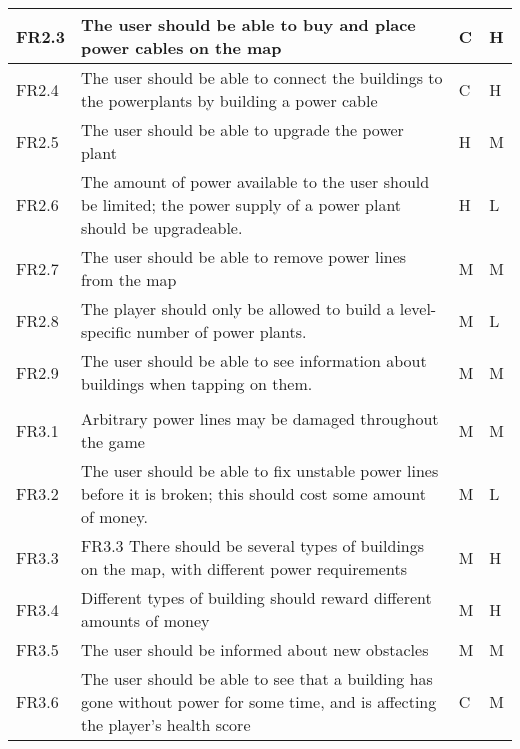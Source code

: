 \begin{longtable}{| p{1.5cm} | p{8cm} | p{1.5cm} | p{2cm} |}
   FR2.3 & The user should be able to buy and place power cables on the map & C & H \\ \hline

   FR2.4 & The user should be able to connect the buildings to the powerplants by building a power 
   cable & C & H \\ \hline

   FR2.5 & The user should be able to upgrade the power plant & H & M \\ \hline

   FR2.6 & The amount of power available to the user should be limited; the power supply of a 
   power plant should be upgradeable. & H & L \\ \hline

   FR2.7 & The user should be able to remove power lines from the map & M & M \\ \hline

   FR2.8 & The player should only be allowed to build a level-specific number of power plants. & M & L \\ \hline

   FR2.9 & The user should be able to see information about buildings when tapping on them. & M & M \\ \hline
\pagebreak
\hline
\multicolumn{4}{|>{\columncolor[gray]{.8}}l|}{3) Obstacles} \\ \hline

   FR3.1 & Arbitrary power lines may be damaged throughout the game & M & M \\ \hline

   FR3.2 & The user should be able to fix unstable power lines before it is broken; 
   this should cost some amount of money. & M & L \\ \hline

   FR3.3 & FR3.3 There should be several types of buildings on the map, with different power 
   requirements & M & H \\ \hline

   FR3.4 & Different types of building should reward different amounts of money & 
   M & H \\ \hline

   FR3.5 & The user should be informed about new obstacles & M & M \\ \hline

   FR3.6 & The user should be able to see that a building has gone without power 
   for some time, and is affecting the player's health score & C & M \\ \hline


\end{longtable}
